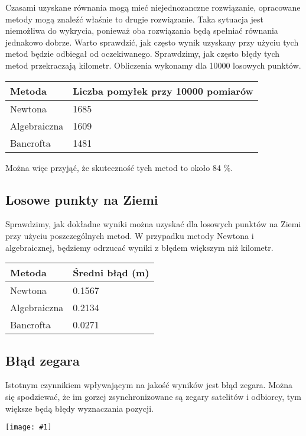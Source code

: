 \documentclass{article}
\newcommand{\plot}[1] {
	\texttt{[image: \#1]}
}
\begin{document}
    Czasami uzyskane równania mogą mieć niejednozanczne rozwiązanie, opracowane metody mogą znaleźć właśnie to drugie rozwiązanie.
    Taka sytuacja jest niemożliwa do wykrycia, ponieważ oba rozwiązania będą spełniać równania jednakowo dobrze.
    Warto sprawdzić, jak często wynik uzyskany przy użyciu tych metod będzie odbiegał od oczekiwanego. Sprawdzimy, jak często błędy tych metod przekraczają kilometr. Obliczenia wykonamy dla 10000 losowych punktów. \\

\begin{tabular}{ |p{4cm}|p{6cm}|  }
 \hline
 	Metoda  & Liczba pomyłek przy 10000 pomiarów\\
 \hline
  	Newtona & 1685 \\
 \hline
 	Algebraiczna & 1609 \\
 \hline
 	Bancrofta & 1481 \\
 \hline
\end{tabular}

	 Można więc przyjąć, że skuteczność tych metod to około 84 \%.

\subsection{Losowe punkty na Ziemi}
	Sprawdzimy, jak dokładne wyniki można uzyskać dla losowych punktów na Ziemi przy użyciu poszczególnych metod. W przypadku metody Newtona i algebraicznej, będziemy odrzucać wyniki z błędem większym niż kilometr.

	\begin{tabular}{ |p{4cm}|p{6cm}|  }
 \hline
 	Metoda  & Średni błąd (m) \\
 \hline
  	Newtona & 0.1567 \\
 \hline
 	Algebraiczna & 0.2134 \\
 \hline
 	Bancrofta & 0.0271 \\
 \hline
\end{tabular}


\subsection{ Błąd zegara }
Istotnym czynnikiem wpływającym na jakość wyników jest błąd zegara. Można się spodziewać, że im gorzej zsynchronizowane są zegary satelitów i odbiorcy, tym większe będą błędy wyznaczania pozycji.

\plot{zegar.png}
\end{document}
